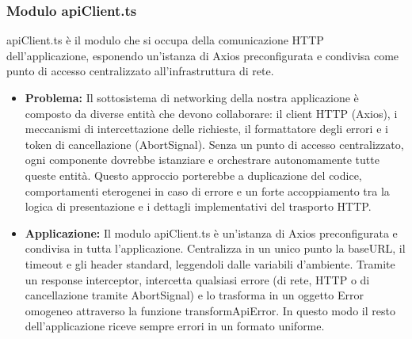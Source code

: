 \documentclass[11pt,a4paper]{article}
\begin{document}
\subsubsection{Modulo apiClient.ts}
apiClient.ts è il modulo che si occupa della comunicazione HTTP dell'applicazione, esponendo un'istanza di Axios preconfigurata e condivisa come punto di accesso centralizzato all'infrastruttura di rete.
\begin{itemize}
    \item \textbf{Problema:} Il sottosistema di networking della nostra applicazione è composto da diverse entità che devono collaborare: il client HTTP (Axios), i meccanismi di intercettazione delle richieste, il formattatore degli errori e i token di cancellazione (AbortSignal). 
    Senza un punto di accesso centralizzato, ogni componente dovrebbe istanziare e orchestrare autonomamente tutte queste entità. Questo approccio porterebbe a duplicazione del codice, comportamenti eterogenei in caso di errore e un forte accoppiamento tra la logica di presentazione e i dettagli implementativi del trasporto HTTP.
    
    \item \textbf{Applicazione:} Il modulo apiClient.ts è un'istanza di Axios preconfigurata e condivisa in tutta l'applicazione. Centralizza in un unico punto la baseURL, il timeout e gli header standard, leggendoli dalle variabili d'ambiente. Tramite un response interceptor, intercetta qualsiasi errore (di rete, HTTP o di cancellazione tramite AbortSignal) e lo trasforma in un oggetto Error omogeneo attraverso la funzione transformApiError. In questo modo il resto dell'applicazione riceve sempre errori in un formato uniforme.
\end{itemize}
\end{document}
